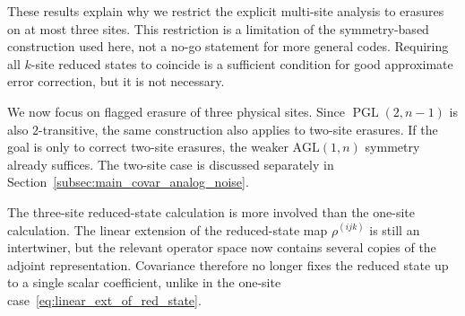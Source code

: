 \documentclass[10pt,twocolumn,superscriptaddress,aps,amsmath,amssymb,citeautoscript,floatfix,prx,longbibliography]{revtex4-2}
\theoremstyle{plain}
\theoremstyle{plain}
\theoremstyle{plain}
\theoremstyle{plain}
\theoremstyle{plain}
\theoremstyle{plain}
\begin{document}
These results explain why we restrict the explicit multi-site analysis to erasures on at most three sites. This restriction is a limitation of the symmetry-based construction used here, not a no-go statement for more general codes. Requiring all $k$-site reduced states to coincide is a sufficient condition for good approximate error correction, but it is not necessary.

We now focus on flagged erasure of three physical sites. Since $\operatorname{PGL}(2,n-1)$ is also $2$-transitive, the same construction also applies to two-site erasures. If the goal is only to correct two-site erasures, the weaker $\mathrm{AGL}(1,n)$ symmetry already suffices. The two-site case is discussed separately in Section~\ref{subsec:main_covar_analog_noise}.

The three-site reduced-state calculation is more involved than the one-site calculation. The linear extension of the reduced-state map $\rho^{(ijk)}$ is still an intertwiner, but the relevant operator space now contains several copies of the adjoint representation. Covariance therefore no longer fixes the reduced state up to a single scalar coefficient, unlike in the one-site case~\eqref{eq:linear_ext_of_red_state}.
\end{document}
